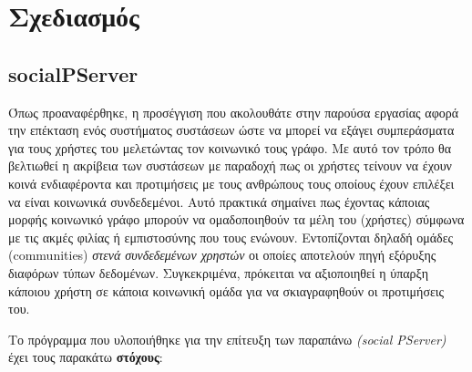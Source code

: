 
\chapter{Σχεδιασμός} %

\label{Σχεδιασμός} %





\section{socialPServer}
\noindent
Όπως προαναφέρθηκε, η προσέγγιση που ακολουθάτε στην παρούσα εργασίας αφορά την επέκταση ενός συστήματος συστάσεων ώστε να μπορεί να εξάγει συμπεράσματα για τους χρήστες του μελετώντας τον κοινωνικό τους γράφο.
Με αυτό τον τρόπο θα βελτιωθεί η ακρίβεια των συστάσεων με παραδοχή πως οι χρήστες τείνουν να έχουν κοινά ενδιαφέροντα και προτιμήσεις
με τους ανθρώπους τους οποίους έχουν επιλέξει να είναι κοινωνικά συνδεδεμένοι.
Αυτό πρακτικά σημαίνει πως έχοντας κάποιας μορφής κοινωνικό γράφο μπορούν να ομαδοποιηθούν τα μέλη του (χρήστες) σύμφωνα
με τις ακμές φιλίας ή εμπιστοσύνης που τους ενώνουν. Εντοπίζονται δηλαδή ομάδες (communities) \emph{στενά συνδεδεμένων χρηστών}
οι οποίες αποτελούν πηγή εξόρυξης διαφόρων τύπων δεδομένων. Συγκεκριμένα, πρόκειται να αξιοποιηθεί η ύπαρξη κάποιου χρήστη
σε κάποια κοινωνική ομάδα για να σκιαγραφηθούν οι προτιμήσεις του.

Το πρόγραμμα που υλοποιήθηκε για την επίτευξη των παραπάνω  \emph{(social PServer)}  έχει τους παρακάτω \textbf{στόχους}:

